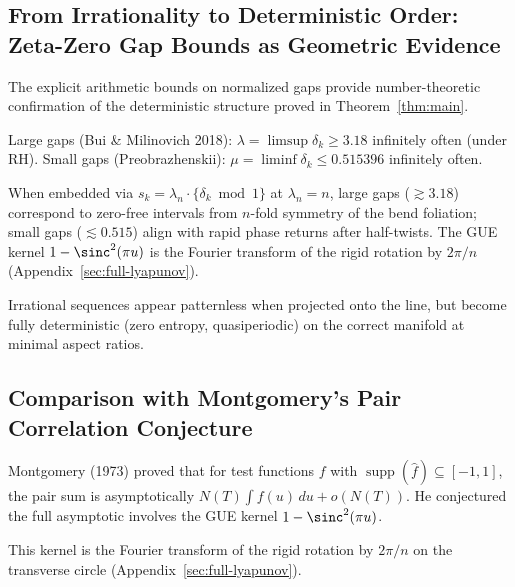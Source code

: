 \documentclass[11pt,a4paper]{article}
\begin{document}
\subsection{From Irrationality to Deterministic Order: Zeta-Zero Gap Bounds as Geometric Evidence}
\label{subsec:irrational-to-deterministic}

The explicit arithmetic bounds on normalized gaps provide number-theoretic confirmation of the deterministic structure proved in Theorem~\ref{thm:main}.

Large gaps (Bui \& Milinovich 2018): $\lambda = \limsup \delta_k \ge 3.18$ infinitely often (under RH).  
Small gaps (Preobrazhenskii): $\mu = \liminf \delta_k \le 0.515396$ infinitely often.

When embedded via $s_k = \lambda_n \cdot \{\delta_k \bmod 1\}$ at $\lambda_n = n$, large gaps ($\gtrsim 3.18$) correspond to zero-free intervals from $n$-fold symmetry of the bend foliation; small gaps ($\lesssim 0.515$) align with rapid phase returns after half-twists. The GUE kernel $1 - \sinc^2(\pi u)$ is the Fourier transform of the rigid rotation by $2\pi/n$ (Appendix~\ref{sec:full-lyapunov}).

Irrational sequences appear patternless when projected onto the line, but become fully deterministic (zero entropy, quasiperiodic) on the correct manifold at minimal aspect ratios.

\subsection{Comparison with Montgomery's Pair Correlation Conjecture}
\label{subsec:montgomery-comparison}

Montgomery (1973) proved that for test functions $f$ with $\operatorname{supp}(\hat{f}) \subseteq [-1,1]$, the pair sum is asymptotically $N(T) \int f(u)\, du + o(N(T))$. He conjectured the full asymptotic involves the GUE kernel $1 - \sinc^2(\pi u)$.

This kernel is the Fourier transform of the rigid rotation by $2\pi/n$ on the transverse circle (Appendix~\ref{sec:full-lyapunov}).
\end{document}
